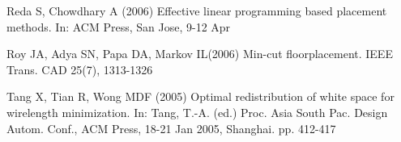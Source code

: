 \documentclass[natbib]{svcyclop}
\begin{document}
\begin{thebibliography}{12}
 {Reda} S,
{Chowdhary} A (2006) Effective linear programming based
placement methods. In: ACM Press, San Jose, 9-12 Apr

{Roy} JA, {Adya} SN, {Papa} DA, {Markov} IL(2006) Min-cut floorplacement.
IEEE Trans. CAD 25(7), 1313-1326

{Tang} X, {Tian} R, {Wong} MDF (2005) Optimal redistribution of white
space for wirelength minimization. In: Tang, T.-A. (ed.) Proc.
Asia South Pac. Design Autom. Conf., ACM Press, 18-21 Jan
2005, Shanghai. pp. 412-417

\end{thebibliography}
\end{document}
